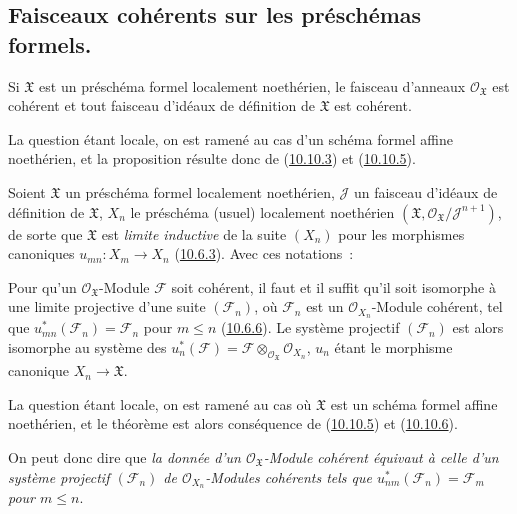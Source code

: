 \subsection{Faisceaux cohérents sur les préschémas formels.}
\label{subsection:I.10.11-fr}

\begin{proposition}[10.11.1]
\label{I.10.11.1-fr}
Si $\mathfrak{X}$ est un préschéma formel localement noethérien, le
faisceau d'anneaux $\mathscr{O}_{\mathfrak{X}}$ est cohérent et tout
faisceau d'idéaux de définition de $\mathfrak{X}$ est cohérent.
\end{proposition}

La question étant locale, on est ramené au cas d'un schéma formel affine
noethérien, et la proposition résulte donc de
(\hyperref[I.10.10.3-fr]{10.10.3}) et
(\hyperref[I.10.10.5-fr]{10.10.5}).

\begin{env}[10.11.2]
\label{I.10.11.2-fr}
Soient $\mathfrak{X}$ un préschéma formel localement noethérien,
$\mathscr{J}$ un faisceau d'idéaux de définition de $\mathfrak{X}$,
$X_n$ le préschéma (usuel) localement noethérien
$(\mathfrak{X},\mathscr{O}_{\mathfrak{X}}/\mathscr{J}^{n+1})$, de
sorte que $\mathfrak{X}$ est \emph{limite inductive} de la suite $(X_n)$ pour
les morphismes canoniques $u_{mn}:X_m\to X_n$
(\hyperref[I.10.6.3-fr]{10.6.3}). Avec ces notations~:
\end{env}

\begin{theorem}[10.11.3]
\label{I.10.11.3-fr}
Pour qu'un $\mathscr{O}_{\mathfrak{X}}$-Module $\mathscr{F}$ soit
cohérent, il faut et il suffit qu'il soit isomorphe à une limite
projective d'une suite $(\mathscr{F}_n)$, où $\mathscr{F}_n$ est un
$\mathscr{O}_{X_n}$-Module cohérent, tel que
$u_{mn}^*(\mathscr{F}_n)=\mathscr{F}_n$ pour $m\leq n$
\textup{(\hyperref[I.10.6.6-fr]{10.6.6})}. Le système projectif
$(\mathscr{F}_n)$ est alors isomorphe au système des
$u_n^*(\mathscr{F})=\mathscr{F}
\otimes_{\mathscr{O}_{\mathfrak{X}}}\mathscr{O}_{X_n}$, $u_n$ étant
le morphisme canonique $X_n\to\mathfrak{X}$.
\end{theorem}

La question étant locale, on est ramené au cas où $\mathfrak{X}$ est
un schéma formel affine noethérien, et le théorème est alors conséquence
de (\hyperref[I.10.10.5-fr]{10.10.5}) et
(\hyperref[I.10.10.6-fr]{10.10.6}).

On peut donc dire que \emph{la donnée d'un
$\mathscr{O}_{\mathfrak{X}}$-Module cohérent équivaut à celle d'un
système projectif $(\mathscr{F}_n)$ de
$\mathscr{O}_{X_n}$-Modules cohérents tels que
$u_{nm}^*(\mathscr{F}_n)=\mathscr{F}_m$ pour $m\leq n$}.

